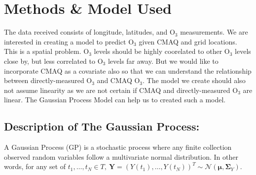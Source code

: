 \documentclass{article}                                                   %
\begin{document}
\section{Methods \& Model Used}
  The data received consists of longitude, latitudes, and O$_3$ measurements.
  We are interested in creating a model to predict O$_3$ given CMAQ and grid 
  locations. This is a spatial problem. O$_3$ levels should be highly coorelated 
  to other O$_3$ levels close by, but less correlated to O$_3$ levels far away. 
  But we would like to incorporate CMAQ as a covariate also so that we can
  understand the relationship between directly-measured O$_3$ and CMAQ O$_3$.
  The model we create should also not assume linearity as we are not certain if
  CMAQ and directly-measured O$_3$ are linear. The Gaussian Process Model can
  help us to created such a model. 

  \subsection{Description of The Gaussian Process:}
  A Gaussian Process (GP) is a stochastic process where any finite collection
  observed random variables follow a multivariate normal distribution.
  In other words, for any set of $t_1,\dots,t_N \in T,~\bm{Y} =
  (Y(t_1),\dots,Y(t_N))^T \sim \mathcal{N}(\bm\mu,\bm\Sigma_Y)$.

\end{document}

